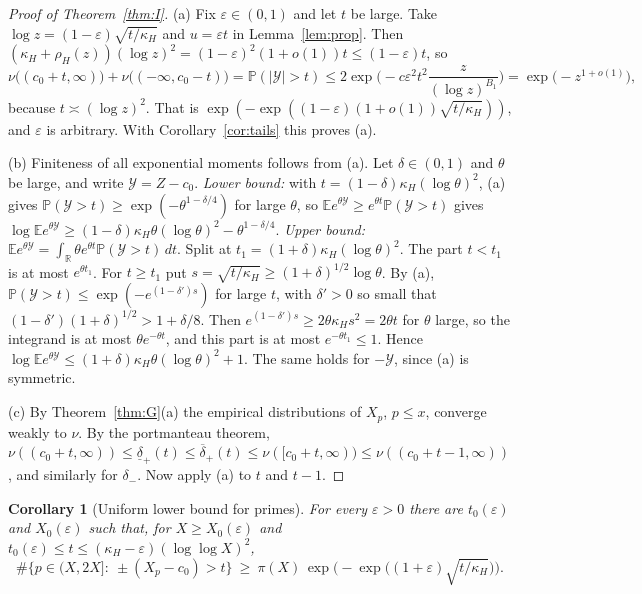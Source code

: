 \documentclass[11pt]{amsart}
\newtheorem{corollary}[lemma]{Corollary}
\theoremstyle{remark}
\newcommand{\E}{\mathbb{E}}
\newcommand{\Prob}{\mathbb{P}}
\begin{document}
\begin{proof}[Proof of Theorem~\ref{thm:I}]
(a) Fix $\varepsilon\in(0,1)$ and let $t$ be large. Take $\log z=(1-\varepsilon)\sqrt{t/\kappa_H}$ and $u=\varepsilon t$ in Lemma~\ref{lem:prop}. Then $(\kappa_H+\rho_H(z))(\log z)^2=(1-\varepsilon)^2(1+o(1))t\le(1-\varepsilon)t$, so
\[
\nu\big((c_0+t,\infty)\big)+\nu\big((-\infty,c_0-t)\big)=\Prob(|\mathcal Y|>t)\le2\exp\Big(-c\varepsilon^2t^2\frac z{(\log z)^{B_1}}\Big)=\exp\big(-z^{1+o(1)}\big),
\]
because $t\asymp(\log z)^2$. That is $\exp(-\exp((1-\varepsilon)(1+o(1))\sqrt{t/\kappa_H}))$, and $\varepsilon$ is arbitrary. With Corollary~\ref{cor:tails} this proves (a).

(b) Finiteness of all exponential moments follows from (a). Let $\delta\in(0,1)$ and $\theta$ be large, and write $\mathcal Y=Z-c_0$. \emph{Lower bound:} with $t=(1-\delta)\kappa_H(\log\theta)^2$, (a) gives $\Prob(\mathcal Y>t)\ge\exp(-\theta^{1-\delta/4})$ for large $\theta$, so $\E e^{\theta\mathcal Y}\ge e^{\theta t}\Prob(\mathcal Y>t)$ gives $\log\E e^{\theta\mathcal Y}\ge(1-\delta)\kappa_H\theta(\log\theta)^2-\theta^{1-\delta/4}$. \emph{Upper bound:} $\E e^{\theta\mathcal Y}=\int_{\mathbb R}\theta e^{\theta t}\Prob(\mathcal Y>t)\,dt$. Split at $t_1=(1+\delta)\kappa_H(\log\theta)^2$. The part $t<t_1$ is at most $e^{\theta t_1}$. For $t\ge t_1$ put $s=\sqrt{t/\kappa_H}\ge(1+\delta)^{1/2}\log\theta$. By (a), $\Prob(\mathcal Y>t)\le\exp(-e^{(1-\delta')s})$ for large $t$, with $\delta'>0$ so small that $(1-\delta')(1+\delta)^{1/2}>1+\delta/8$. Then $e^{(1-\delta')s}\ge2\theta\kappa_Hs^2=2\theta t$ for $\theta$ large, so the integrand is at most $\theta e^{-\theta t}$, and this part is at most $e^{-\theta t_1}\le1$. Hence $\log\E e^{\theta\mathcal Y}\le(1+\delta)\kappa_H\theta(\log\theta)^2+1$. The same holds for $-\mathcal Y$, since (a) is symmetric.

(c) By Theorem~\ref{thm:G}(a) the empirical distributions of $X_p$, $p\le x$, converge weakly to $\nu$. By the portmanteau theorem, $\nu((c_0+t,\infty))\le\underline\delta_+(t)\le\overline\delta_+(t)\le\nu([c_0+t,\infty))\le\nu((c_0+t-1,\infty))$, and similarly for $\delta_-$. Now apply (a) to $t$ and $t-1$.
\end{proof}

\begin{corollary}[Uniform lower bound for primes]\label{cor:unif}
For every $\varepsilon>0$ there are $t_0(\varepsilon)$ and $X_0(\varepsilon)$ such that, for $X\ge X_0(\varepsilon)$ and $t_0(\varepsilon)\le t\le(\kappa_H-\varepsilon)(\log\log X)^2$,
\[
\#\{p\in(X,2X]:\ \pm(X_p-c_0)>t\}\ \ge\ \pi(X)\,\exp\Big(-\exp\big((1+\varepsilon)\sqrt{t/\kappa_H}\big)\Big).
\]
\end{corollary}
\end{document}
